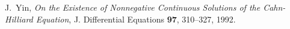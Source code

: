 \documentclass[11pt,  reqno]{amsart}%
\theoremstyle{plain}
\theoremstyle{definition}
\theoremstyle{remark}
\numberwithin{equation}{section}
\begin{document}
\begin{thebibliography}{}
J.~Yin,
\textit{On the {E}xistence of {N}onnegative {C}ontinuous {S}olutions of the {C}ahn-{H}illiard {E}quation},
J. Differential Equations \textbf{97}, 310--327, 1992.

%
%





   
    
                        
	\end{thebibliography}
\end{document}
